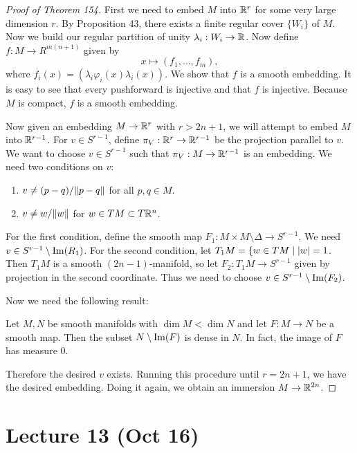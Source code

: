 \documentclass[twoside, 10pt]{article}
\begin{document}
    \begin{proof}[Proof of Theorem 154]
        First we need to embed $M$ into $\mathbb{R}^r$ for some very large dimension $r$. By Proposition 43, there exists a finite regular cover $\{W_i \}$ of $M$. Now we build our regular partition of unity $\lambda_i: W_i \to \mathbb{R}$. Now define $f:M \to R^{m(n+1)}$ given by
        \[ x \mapsto (f_1, \ldots, f_m), \]
        where $f_i(x) = (\lambda_i \varphi_i(x) \lambda_i(x))$. We show that $f$ is a smooth embedding. It is easy to see that every pushforward is injective and that $f$ is injective. Because $M$ is compact, $f$ is a smooth embedding.

        Now given an embedding $M \to \mathbb{R}^r$ with $r>2n+1$, we will attempt to embed $M$ into $\mathbb{R}^{r-1}$. For $v \in S^{r-1}$, define $\pi_V: \mathbb{R}^r \to \mathbb{R}^{r-1}$ be the projection parallel to $v$. We want to choose $v \in S^{r-1}$ such that $\pi_V:M \to \mathbb{R}^{r-1}$ is an embedding. We need two conditions on $v$:
        \begin{enumerate}
            \item $v \neq (p-q)/\lVert p-q\rVert$ for all $p,q \in M$.
            \item $v \neq w/\lVert w\rVert$ for $w \in TM \subset T\mathbb{R}^n$.
        \end{enumerate}
        For the first condition, define the smooth map $F_1:M \times M \setminus \Delta \to S^{r-1}$. We need $v \in S^{r-1} \setminus \mathrm{Im}(R_1)$. For the second condition, let $T_1M = \{w \in TM \mid \lvert w\rvert = 1$. Then $T_1M$ is a smooth $(2n-1)$-manifold, so let $F_2: T_1M \to S^{r-1}$ given by projection in the second coordinate. Thus we need to choose $v \in S^{r-1} \setminus \mathrm{Im}(F_2)$.
        
        Now we need the following result:

        \begin{thm}
            Let $M,N$ be smooth manifolds with $\dim M < \dim N$ and let $F:M \to N$ be a smooth map. Then the subset $N \setminus \mathrm{Im}(F)$ is dense in $N$. In fact, the image of $F$ has measure $0$.
        \end{thm}

        Therefore the desired $v$ exists. Running this procedure until $r = 2n+1$, we have the desired embedding. Doing it again, we obtain an immersion $M \to \mathbb{R}^{2n}$.
    \end{proof}

    \section{Lecture 13 (Oct 16)}%
    \label{sec:lecture_13_oct_16_}
    
\end{document}
